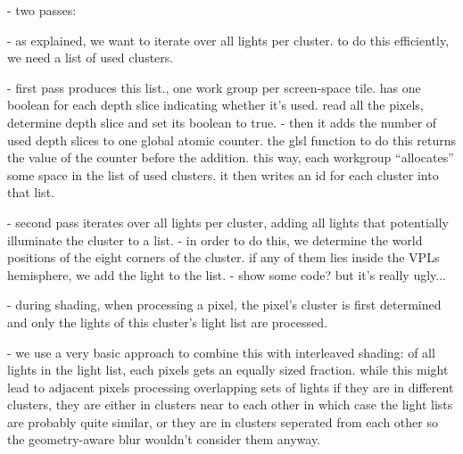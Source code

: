 - two passes:

- as explained, we want to iterate over all lights per cluster. to do this efficiently, we need a list of used clusters.

- first pass produces this list., one work group per screen-space tile. has one boolean for each depth slice indicating whether it's used. read all the pixels, determine depth slice and set its boolean to true.
- then it adds the number of used depth slices to one global atomic counter. the glsl function to do this returns the value of the counter before the addition.
this way, each workgroup ``allocates'' some space in the list of used clusters. it then writes an id for each cluster into that list.

- second pass iterates over all lights per cluster, adding all lights that potentially illuminate the cluster to a list.
- in order to do this, we determine the world positions of the eight corners of the cluster. if any of them lies inside the VPLs hemisphere, we add the light to the list.
- show some code? but it's really ugly...

- during shading, when processing a pixel, the pixel's cluster is first determined and only the lights of this cluster's light list are processed.

- we use a very basic approach to combine this with interleaved shading: of all lights in the light list, each pixels gets an equally sized fraction. while this might lead to adjacent pixels processing overlapping sets of lights if they are in different clusters, they are either in clusters near to each other in which case the light lists are probably quite similar, or they are in clusters seperated from each other so the geometry-aware blur wouldn't consider them anyway.
